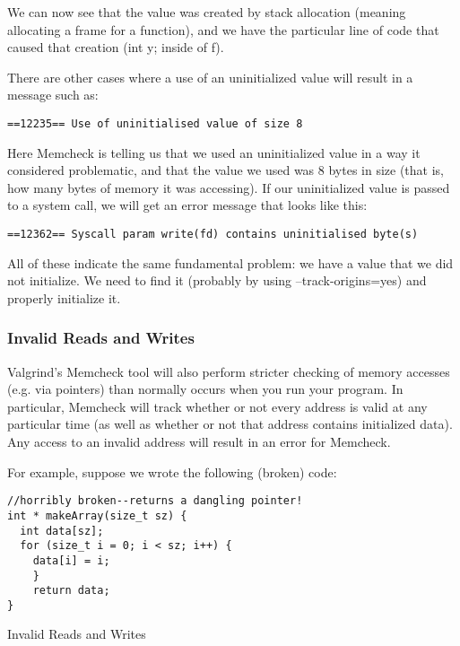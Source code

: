 \documentclass[11pt, a4paper]{article}
\begin{document}
We can now see that the value was created by stack allocation (meaning allocating a frame for a function), and we have the particular line of code that caused that creation (int y; inside of f).

There are other cases where a use of an uninitialized value will result in a message such as:

\begin{verbatim}
==12235== Use of uninitialised value of size 8
\end{verbatim}



Here Memcheck is telling us that we used an uninitialized value in a way it considered problematic, and that the value we used was 8 bytes in size (that is, how many bytes of memory it was accessing). If our uninitialized value is passed to a system call, we will get an error message that looks like this:


\begin{verbatim}
==12362== Syscall param write(fd) contains uninitialised byte(s)
\end{verbatim}


All of these indicate the same fundamental problem: we have a value that we did not initialize. We need to find it (probably by using --track-origins=yes) and properly initialize it.





\subsubsection{Invalid Reads and Writes}%
\label{ssub:invalid_reads_and_writes}




Valgrind’s Memcheck tool will also perform stricter checking of memory accesses (e.g. via pointers) than normally occurs when you run your program. In particular, Memcheck will track whether or not every address is valid at any particular time (as well as whether or not that address contains initialized data). Any access to an invalid address will result in an error for Memcheck.

For example, suppose we wrote the following (broken) code:

\begin{listing}
\begin{verbatim}
//horribly broken--returns a dangling pointer!
int * makeArray(size_t sz) {
  int data[sz];
  for (size_t i = 0; i < sz; i++) {
    data[i] = i;
 	}
 	return data;
}
\end{verbatim}
\caption{Invalid Reads and Writes}
\label{lst:invalid_reads_and_writes}
\end{listing}
\end{document}

